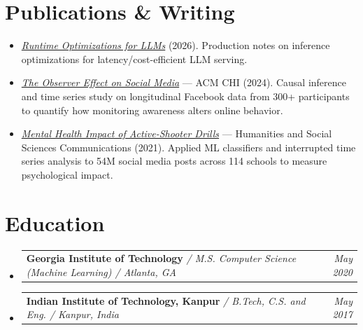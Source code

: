 \documentclass[letterpaper,10pt]{extarticle}
\makeatletter
\newcommand{\resumeSubheadingCompact}[4]{
  \vspace{-1pt}\item
    \begin{tabular*}{0.97\textwidth}{l@{\extracolsep{\fill}}r}
      \textbf{#1} \textit{\small / #3 / #4} & \textit{\small #2} \\
    \end{tabular*}\vspace{-9pt}
}
\newcommand{\resumeCompactSectionListStart}{\begin{itemize}[leftmargin=*, itemsep=0pt, topsep=2pt, parsep=0pt, partopsep=0pt]}
\newcommand{\resumeEducationListStart}{\begin{itemize}[leftmargin=*, itemsep=-1pt, topsep=1pt, parsep=0pt, partopsep=0pt]}
\newcommand{\resumeSubHeadingListEnd}{\end{itemize}}
\makeatother
\begin{document}
\section{Publications \& Writing}
\resumeCompactSectionListStart
  \item\small{\href{https://pranshug.com/blog/runtime-optimizations-for-llms}{\textit{Runtime Optimizations for LLMs}} (2026). Production notes on inference optimizations for latency/cost-efficient LLM serving.}
  \item\small{\href{https://dl.acm.org/doi/10.1145/3613904.3642078}{\textit{The Observer Effect on Social Media}} — ACM CHI (2024). Causal inference and time series study on longitudinal Facebook data from 300+ participants to quantify how monitoring awareness alters online behavior.}
  \item\small{\href{https://www.nature.com/articles/s41599-021-00993-6}{\textit{Mental Health Impact of Active-Shooter Drills}} — Humanities and Social Sciences Communications (2021). Applied ML classifiers and interrupted time series analysis to 54M social media posts across 114 schools to measure psychological impact.}
\resumeSubHeadingListEnd

\section{Education}
\resumeEducationListStart
  \resumeSubheadingCompact
    {Georgia Institute of Technology}{May 2020}
    {M.S. Computer Science (Machine Learning)}{Atlanta, GA}
  \resumeSubheadingCompact
    {Indian Institute of Technology, Kanpur}{May 2017}
    {B.Tech, C.S. and Eng.}{Kanpur, India}
\resumeSubHeadingListEnd
\end{document}
